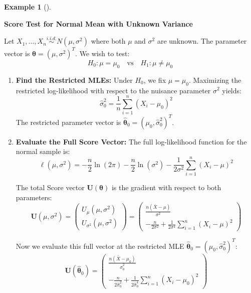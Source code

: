 \documentclass[
  letterpaper,
  DIV=11,
  numbers=noendperiod]{scrreprt}
\renewcommand{\[}{\begin{equation}}
\renewcommand{\]}{\end{equation}}
\theoremstyle{definition}
\theoremstyle{plain}
\theoremstyle{plain}
\theoremstyle{plain}
\theoremstyle{definition}
\newtheorem{example}{Example}[chapter]
\theoremstyle{plain}
\theoremstyle{remark}
\begin{document}
\begin{example}[]\protect\hypertarget{exm-score-normal}{}\label{exm-score-normal}

\textbf{Score Test for Normal Mean with Unknown Variance}

Let \(X_1, \dots, X_n \overset{i.i.d.}{\sim} N(\mu, \sigma^2)\) where
both \(\mu\) and \(\sigma^2\) are unknown. The parameter vector is
\(\boldsymbol{\theta} = (\mu, \sigma^2)^T\). We wish to test:
\[H_0: \mu = \mu_0 \quad \text{vs} \quad H_1: \mu \neq \mu_0\]

\begin{enumerate}
\def\labelenumi{\arabic{enumi}.}
\item
  \textbf{Find the Restricted MLEs:} Under \(H_0\), we fix
  \(\mu = \mu_0\). Maximizing the restricted log-likelihood with respect
  to the nuisance parameter \(\sigma^2\) yields:
  \[\hat{\sigma}_0^2 = \frac{1}{n}\sum_{i=1}^n (X_i - \mu_0)^2\] The
  restricted parameter vector is
  \(\hat{\boldsymbol{\theta}}_0 = (\mu_0, \hat{\sigma}_0^2)^T\).
\item
  \textbf{Evaluate the Full Score Vector:} The full log-likelihood
  function for the normal sample is:
  \[\ell(\mu, \sigma^2) = -\frac{n}{2}\ln(2\pi) - \frac{n}{2}\ln(\sigma^2) - \frac{1}{2\sigma^2}\sum_{i=1}^n (X_i - \mu)^2\]

  The total Score vector \(\mathbf{U}(\boldsymbol{\theta})\) is the
  gradient with respect to both parameters:
  \[\mathbf{U}(\mu, \sigma^2) = \begin{pmatrix} U_\mu(\mu, \sigma^2) \\ U_{\sigma^2}(\mu, \sigma^2) \end{pmatrix} = \begin{pmatrix} \frac{n(\bar{X} - \mu)}{\sigma^2} \\ -\frac{n}{2\sigma^2} + \frac{1}{2\sigma^4}\sum_{i=1}^n (X_i - \mu)^2 \end{pmatrix}\]

  Now we evaluate this full vector at the restricted MLE
  \(\hat{\boldsymbol{\theta}}_0 = (\mu_0, \hat{\sigma}_0^2)^T\):
  \[\mathbf{U}(\hat{\boldsymbol{\theta}}_0) = \begin{pmatrix} \frac{n(\bar{X} - \mu_0)}{\hat{\sigma}_0^2} \\ -\frac{n}{2\hat{\sigma}_0^2} + \frac{1}{2\hat{\sigma}_0^4}\sum_{i=1}^n (X_i - \mu_0)^2 \end{pmatrix}\]


\end{enumerate}
\end{example}
\end{document}
